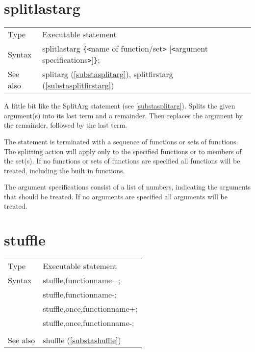 
\section{splitlastarg}
\label{substasplitlastarg}

\noindent \begin{tabular}{ll}
Type & Executable statement\\
Syntax & splitlastarg \verb:{:{\tt<}name of function/set{\tt>}
         [{\tt<}argument specifications{\tt>}]\verb:}:;
\\ See also & splitarg (\ref{substasplitarg}),
             splitfirstarg (\ref{substasplitfirstarg})
\end{tabular}\vspace{4mm}

\noindent A little bit like the 
SplitArg statement (see \ref{substasplitarg}). Splits the 
given argument(s) into its last term and a remainder. Then replaces the 
argument by the remainder, followed by the last term.

\noindent The statement is terminated with a sequence of functions or sets 
of functions. The splitting action will apply only to the specified 
functions or to members of the set(s). If no functions or sets 
of functions are specified all functions will be treated, including the 
built in functions.
 
\noindent The argument specifications consist of a list of numbers, 
indicating the arguments that should be treated. If no arguments are 
specified all arguments will be treated. \vspace{10mm}

%
\section{stuffle}
\label{substastuffle}

\noindent \begin{tabular}{ll}
Type & Executable statement\\
Syntax & stuffle,functionname+; \\
       & stuffle,functionname-; \\
       & stuffle,once,functionname+; \\
       & stuffle,once,functionname-; \\
\\ See also & shuffle (\ref{substashuffle})
\end{tabular} \vspace{4mm}

